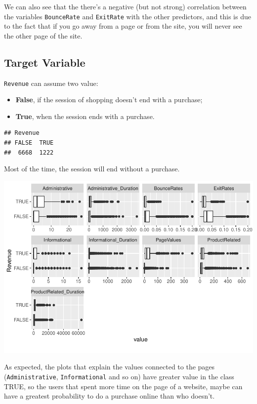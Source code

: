 \documentclass[
]{article}
\begin{document}
We can also see that the there's a negative (but not strong) correlation
between the variables \texttt{BounceRate} and \texttt{ExitRate} with the
other predictors, and this is due to the fact that if you go away from a
page or from the site, you will never see the other page of the site.

\newpage

\subsection{Target Variable}\label{target-variable}

\texttt{Revenue} can assume two value:

\begin{itemize}
\item
  \textbf{False}, if the session of shopping doesn't end with a
  purchase;
\item
  \textbf{True}, when the session ends with a purchase.
\end{itemize}

\begin{verbatim}
## Revenue
## FALSE  TRUE 
##  6668  1222
\end{verbatim}

Most of the time, the session will end without a purchase.

\includegraphics{report_official_files/figure-latex/unnamed-chunk-9-1.pdf}

As expected, the plots that explain the values connected to the pages
(\texttt{Administrative}, \texttt{Informational} and so on) have greater
value in the class TRUE, so the users that spent more time on the page
of a website, maybe can have a greatest probability to do a purchase
online than who doesn't.
\end{document}
